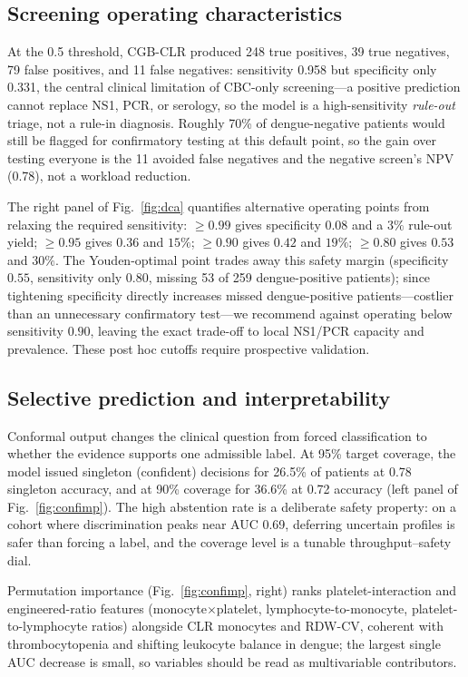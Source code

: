 \documentclass[conference]{IEEEtran}
\begin{document}
\subsection{Screening operating characteristics}

At the 0.5 threshold, CGB-CLR produced 248 true positives, 39 true negatives,
79 false positives, and 11 false negatives: sensitivity 0.958 but specificity
only 0.331, the central clinical limitation of CBC-only screening---a
positive prediction cannot replace NS1, PCR, or serology, so the model is a
high-sensitivity \emph{rule-out} triage, not a rule-in diagnosis. Roughly 70\%
of dengue-negative patients would still be flagged for confirmatory testing at
this default point, so the gain over testing everyone is the 11 avoided false
negatives and the negative screen's NPV (0.78), not a workload reduction.

The right panel of Fig.~\ref{fig:dca} quantifies alternative operating points
from relaxing the required sensitivity: $\geq0.99$ gives specificity $0.08$
and a $3\%$ rule-out yield; $\geq0.95$ gives $0.36$ and $15\%$; $\geq0.90$
gives $0.42$ and $19\%$; $\geq0.80$ gives $0.53$ and $30\%$. The Youden-optimal
point trades away this safety margin (specificity $0.55$, sensitivity only
$0.80$, missing 53 of 259 dengue-positive patients); since tightening
specificity directly increases missed dengue-positive patients---costlier than
an unnecessary confirmatory test---we recommend against operating below
sensitivity $0.90$, leaving the exact trade-off to local NS1/PCR capacity and
prevalence. These post hoc cutoffs require prospective validation.

\subsection{Selective prediction and interpretability}

Conformal output changes the clinical question from forced classification to
whether the evidence supports one admissible label. At 95\% target coverage,
the model issued singleton (confident) decisions for 26.5\% of patients at
0.78 singleton accuracy, and at 90\% coverage for 36.6\% at 0.72 accuracy (left
panel of Fig.~\ref{fig:confimp}). The high abstention rate is a deliberate
safety property: on a cohort where discrimination peaks near AUC 0.69,
deferring uncertain profiles is safer than forcing a label, and the coverage
level is a tunable throughput--safety dial.

Permutation importance (Fig.~\ref{fig:confimp}, right) ranks
platelet-interaction and engineered-ratio features
(monocyte$\times$platelet, lymphocyte-to-monocyte, platelet-to-lymphocyte
ratios) alongside CLR monocytes and RDW-CV, coherent with thrombocytopenia and
shifting leukocyte balance in dengue; the largest single AUC decrease is
small, so variables should be read as multivariable contributors.
\end{document}

